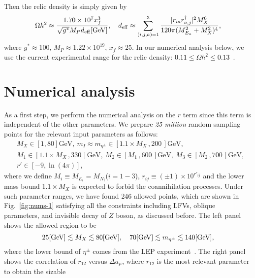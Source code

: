 \documentclass[%
showkeys,12pt,
preprint,preprintnumbers,nofootinbib,
groupedaddress,superscriptaddress,amsmath,amssymb]{revtex4}
\newcommand{\nn}{\nonumber}
\numberwithin{equation}{section}
\begin{document}
Then the relic density is simply given by
\begin{align}
\Omega h^2\approx \frac{1.70\times10^{7} x_f^3}
{\sqrt{g^*} M_P d_{\rm eff} [{\rm GeV}]},
\quad
{ d_{\rm eff}\approx \sum_{(i,j,a)=1}^3\frac{|r_{ia}r^\dag_{a,j}|^2 M_X^6}{120\pi(M_{E_a}^2+M_X^2)^4},}
\end{align}
where $g^*\approx100$, $M_P\approx 1.22\times 10^{19}$, $x_f\approx25$.
In our numerical analysis below, we use the current experimental 
range for the relic density: $0.11\le \Omega h^2\le 0.13$~\cite{Ade:2013zuv}.\\



\section{Numerical analysis \label{sec:numerical}}
As a first step, we perform the numerical analysis on the $r$ term
since this term is independent of the other parameters.
We prepare {\it 25 million} random sampling points
for the relevant input parameters as follows: 
{\begin{align}
& M_X \in [1, {80}]\text{GeV},\
m_{I}\approx m_{\eta^\pm} \in [1.1 \times M_X\,, {{200}}\,]\text{GeV},
\nn\\&
M_{1} \in [1.1\times M_X\,, {330}\,]\text{GeV},\
M_{2}  \in [M_1\,, 600\,]\text{GeV},
\
M_{3}  \in [M_{2}\,, 700\,]\text{GeV},\nn\\ &
r'\in[-9,\ln(4\pi)],
\label{range_scanning}
\end{align}
}
where we define {$M_i\equiv M_{E_i}=M_{N_i}$($i=1-3$)}, $r_{ij}\equiv (\pm1)\times10^{r'_{ij}}$ and the lower mass 
bound $1.1\times M_X$ is expected to forbid the coannihilation processes. 
Under such parameter ranges, we have found 246 allowed points, which are
shown in Fig.~\ref{fig:nums-1} satisfying all the constraints including 
LFVs, oblique parameters, and invisible decay of $Z$ boson, as discussed before.
The left panel shows the allowed region to be
\begin{align}
25  {\rm [GeV]} \lesssim M_X \lesssim 80 {\rm [GeV]},\quad  70  {\rm [GeV]}\lesssim m_{\eta^\pm} \lesssim 140 {\rm [GeV]},
\end{align}
where the lower bound of $\eta^\pm$ comes from the 
LEP experiment~\cite{Osland:2013sla, Akeroyd:2016ymd}.
The right panel shows the correlation of $r_{12}$ versus $\Delta a_\mu$,
where $r_{12}$ is the most relevant parameter to obtain the sizable 
\end{document}
